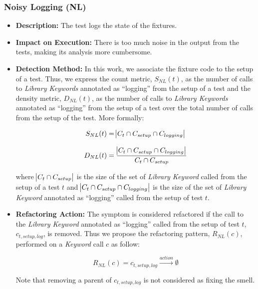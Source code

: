 \subsubsection{Noisy Logging (NL)}

\begin{itemize}
    \item \textbf{Description:} The test logs the state of the fixtures.

    \item \textbf{Impact on Execution:} There is too much noise in the output from the tests, making its analysis more cumbersome.

    \item \textbf{Detection Method:} In this work, we associate the fixture code to the setup of a test. Thus, we express the count metric, $S_{NL}(t)$, as the number of calls to \emph{Library Keywords} annotated as ``logging'' from the setup of a test and the density metric, $D_{NL}(t)$, as the number of calls to \emph{Library Keywords} annotated as ``logging'' from the setup of a test over the total number of calls from the setup of the test. More formally:

    \begin{equation*}
        S_{NL}(t) = \abs{C_{t} \cap C_{setup} \cap C_{logging}}
    \end{equation*}
    
    \begin{equation*}
        D_{NL}(t) = \frac{\abs{C_{t} \cap C_{setup} \cap C_{logging}}}{C_{t} \cap C_{setup}}
    \end{equation*}
    
    where $\abs{C_{t} \cap C_{setup}}$ is the size of the set of \emph{Library Keyword} called from the setup of a test $t$ and $\abs{C_{t} \cap C_{setup} \cap C_{logging}}$  is the size of the set of \emph{Library Keyword} annotated as ``logging'' called from the setup of test $t$.
    
    \item \textbf{Refactoring Action:} The symptom is considered refactored if the call to the \emph{Library Keyword} annotated as ``logging'' called from the setup of test $t$, $c_{t, setup, log}$, is removed. Thus we propose the refactoring pattern, $R_{NL}(c)$, performed on a \emph{Keyword} call $c$ as follow:
    
    \begin{equation*}
        R_{NL}(c) = c_{t, setup, log} \xrightarrow{action} \emptyset
    \end{equation*}
    
    Note that removing a parent of $c_{t, setup, log}$ is not considered as fixing the smell.
\end{itemize}

